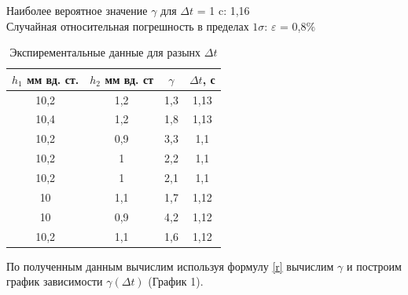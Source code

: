 \documentclass[a4paper,12pt]{article}
\begin{document}
Наиболее вероятное значение $\gamma$ для $\Delta t$ = 1 c: 1,16 \\
Случайная относительная погрешность в пределах $1 \sigma$: $\varepsilon$ = 0,8$\%$


\begin{table}[h!]

	\begin{center}
	
	\caption{Экспирементальные данные для разынх $\Delta t$}
	
	\begin{tabular}{|c|c|c|c|}
	\hline 
	$h_1$ мм вд. ст.& $h_2$ мм вд. ст & $\gamma$ & $\Delta t$, с \\ 
	\hline 
	10,2 & 1,2 & 1,3 & 1,13 \\ 
	\hline 
	10,4 & 1,2 & 1,8 & 1,13 \\ 
	\hline 
	10,2 & 0,9 & 3,3 & 1,1 \\ 
	\hline 
	10,2 & 1 & 2,2 & 1,1 \\ 
	\hline 
	10,2 & 1 & 2,1 & 1,1 \\ 
	\hline 
	10 & 1,1 & 1,7 & 1,12 \\ 
	\hline 
	10 & 0,9 & 4,2 & 1,12 \\ 
	\hline 
	10,2 & 1,1 & 1,6 & 1,12 \\ 
	\hline 
	\end{tabular} 
	\end{center}

\end{table}


\newpage
По полученным данным вычислим используя формулу \eqref{r} вычислим $\gamma$ и построим график зависимости $\gamma(\Delta t)$ (График 1).


\begin{figure}[h!]

	

\end{figure}
\end{document}
